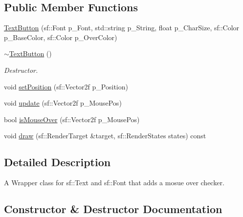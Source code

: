 \subsection*{Public Member Functions}
\begin{DoxyCompactItemize}
\item 
\hyperlink{class_text_button_a03347de6b8c774f7a78a8ce6bbab10fc}{Text\+Button} (sf\+::\+Font p\+\_\+\+Font, std\+::string p\+\_\+\+String, float p\+\_\+\+Char\+Size, sf\+::\+Color p\+\_\+\+Base\+Color, sf\+::\+Color p\+\_\+\+Over\+Color)
\item 
\mbox{\label{class_text_button_a497a17bb110e249c7eb88a98dad12192}} 
\hyperlink{class_text_button_a497a17bb110e249c7eb88a98dad12192}{$\sim$\+Text\+Button} ()
\begin{DoxyCompactList}\small\item\em Destructor. \end{DoxyCompactList}\item 
void \hyperlink{class_text_button_a8a9500a6a76540c73a15ff3a4ceca08a}{set\+Position} (sf\+::\+Vector2f p\+\_\+\+Position)
\item 
void \hyperlink{class_text_button_a255b855a91d7e488fa674abaf302edbb}{update} (sf\+::\+Vector2f p\+\_\+\+Mouse\+Pos)
\item 
bool \hyperlink{class_text_button_a10d99e4de442f5c2bb72ab6b9938813f}{is\+Mouse\+Over} (sf\+::\+Vector2f p\+\_\+\+Mouse\+Pos)
\item 
void \hyperlink{class_text_button_a8b52953d08ee55b437c97843628774c8}{draw} (sf\+::\+Render\+Target \&target, sf\+::\+Render\+States states) const
\end{DoxyCompactItemize}


\subsection{Detailed Description}
A Wrapper class for sf\+::\+Text and sf\+::\+Font that adds a mosue over checker. 

\subsection{Constructor \& Destructor Documentation}
\mbox{\label{class_text_button_a03347de6b8c774f7a78a8ce6bbab10fc}} 
